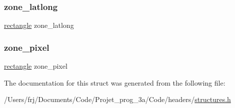 \hypertarget{structcarte_ad42edc35194368fcf17c221930cbabe0}{}\label{structcarte_ad42edc35194368fcf17c221930cbabe0} 
\subsubsection{\texorpdfstring{zone\+\_\+latlong}{zone\_latlong}}
{\footnotesize\ttfamily \hyperlink{structrectangle}{rectangle} zone\+\_\+latlong}

\hypertarget{structcarte_addf5558f9faa154e716d68678b042f98}{}\label{structcarte_addf5558f9faa154e716d68678b042f98} 
\subsubsection{\texorpdfstring{zone\+\_\+pixel}{zone\_pixel}}
{\footnotesize\ttfamily \hyperlink{structrectangle}{rectangle} zone\+\_\+pixel}



The documentation for this struct was generated from the following file\+:\begin{DoxyCompactItemize}
\item 
/\+Users/frj/\+Documents/\+Code/\+Projet\+\_\+prog\+\_\+3a/\+Code/headers/\hyperlink{structures_8h}{structures.\+h}\end{DoxyCompactItemize}
